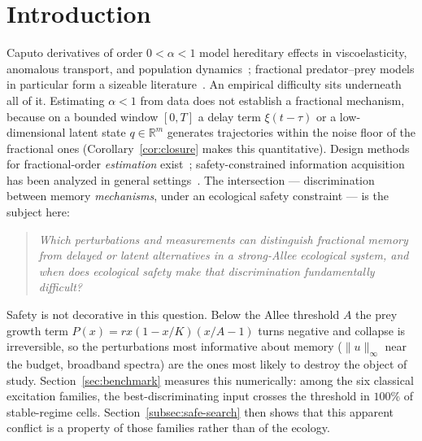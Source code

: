 \section{Introduction}
\label{sec:introduction}

Caputo derivatives of order $0<\alpha<1$ model hereditary effects in viscoelasticity, anomalous transport, and population dynamics~\cite{F01,F02,F03,F04}; fractional predator--prey models in particular form a sizeable literature~\cite{E06,E07,E08,E09}. An empirical difficulty sits underneath all of it. Estimating $\alpha<1$ from data does not establish a fractional mechanism, because on a bounded window $[0,T]$ a delay term $\xi(t-\tau)$ or a low-dimensional latent state $q\in\mathbb{R}^m$ generates trajectories within the noise floor of the fractional ones (Corollary~\ref{cor:closure} makes this quantitative). Design methods for fractional-order \emph{estimation} exist~\cite{FOED01,FOED02,FOED03,FOED04}; safety-constrained information acquisition has been analyzed in general settings~\cite{SAFE26A,SAFE26B}. The intersection --- discrimination between memory \emph{mechanisms}, under an ecological safety constraint --- is the subject here:

\begin{quote}
\emph{Which perturbations and measurements can distinguish fractional memory from delayed or latent alternatives in a strong-Allee ecological system, and when does ecological safety make that discrimination fundamentally difficult?}
\end{quote}

Safety is not decorative in this question. Below the Allee threshold $A$ the prey growth term $P(x)=rx(1-x/K)(x/A-1)$ turns negative and collapse is irreversible, so the perturbations most informative about memory ($\|u\|_\infty$ near the budget, broadband spectra) are the ones most likely to destroy the object of study. Section~\ref{sec:benchmark} measures this numerically: among the six classical excitation families, the best-discriminating input crosses the threshold in $100\%$ of stable-regime cells. Section~\ref{subsec:safe-search} then shows that this apparent conflict is a property of those families rather than of the ecology.



